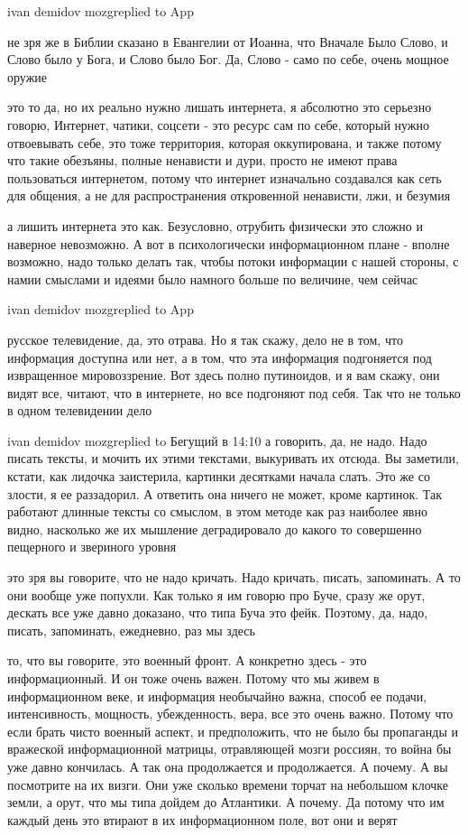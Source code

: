 ivan demidov mozgreplied to App

не зря же в Библии сказано в Евангелии от Иоанна, что Вначале Было Слово, и
Слово было у Бога, и Слово было Бог. Да, Слово - само по себе, очень мощное
оружие

это то да, но их реально нужно лишать интернета, я абсолютно это серьезно
говорю, Интернет, чатики, соцсети - это ресурс сам по себе, который нужно
отвоевывать себе, это тоже территория, которая оккупирована, и также потому что
такие обезъяны, полные ненависти и дури, просто не имеют права пользоваться
интернетом, потому что интернет изначально создавался как сеть для общения, а
не для распространения откровенной ненависти, лжи, и безумия

а лишить интернета это как. Безусловно, отрубить физически это сложно и
наверное невозможно. А вот в психологически информационном плане - вполне
возможно, надо только делать так, чтобы потоки информации с нашей стороны, с
намии смыслами и идеями было намного больше по величине, чем сейчас

ivan demidov mozgreplied to App

русское телевидение, да, это отрава. Но я так скажу, дело не в том, что
информация доступна или нет, а в том, что эта информация подгоняется под
извращенное мировоззрение. Вот здесь полно путиноидов, и я вам скажу, они видят
все, читают, что в интернете, но все подгоняют под себя. Так что не только в
одном телевидении дело

ivan demidov mozgreplied to Бегущий в
14:10
а говорить, да, не надо. Надо писать тексты, и мочить их этими текстами,
выкуривать их отсюда. Вы заметили, кстати, как лидочка заистерила, картинки
десятками начала слать. Это же со злости, я ее раззадорил. А ответить она
ничего не может, кроме картинок. Так работают длинные тексты со смыслом, в этом
методе как раз наиболее явно видно, насколько же их мышление деградировало до
какого то совершенно пещерного и звериного уровня

это зря вы говорите, что не надо кричать. Надо кричать, писать, запоминать. А
то они вообще уже попухли. Как только я им говорю про Буче, сразу же орут,
дескать все уже давно доказано, что типа Буча это фейк. Поэтому, да, надо,
писать, запоминать, ежедневно, раз мы здесь

то, что вы говорите, это военный фронт. А конкретно здесь - это информационный.
И он тоже очень важен. Потому что мы живем в информационном веке, и информация
необычайно важна, способ ее подачи, интенсивность, мощность, убежденность,
вера, все это очень важно. Потому что если брать чисто военный аспект, и
предположить, что не было бы пропаганды и вражеской информационной матрицы,
отравляющей мозги россиян, то война бы уже давно кончилась. А так она
продолжается и продолжается. А почему. А вы посмотрите на их визги. Они уже
сколько времени торчат на небольшом клочке земли, а орут, что мы типа дойдем до
Атлантики. А почему. Да потому что им каждый день это втирают в их
информационном поле, вот они и верят

